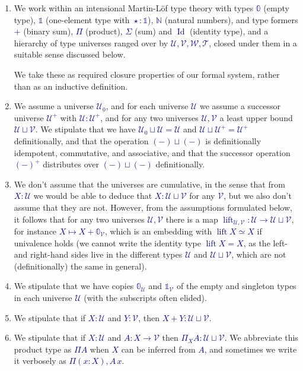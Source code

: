 \documentclass[10pt]{article}
\newcommand{\db}{\textcolor{darkblue}}
\newcommand{\m}[1]{\db{$#1$}}
\newcommand{\lift}{\operatorname{lift}}
\newcommand{\N}{\mathbb{N}}
\newcommand{\U}{\mathcal{U}}
\newcommand{\V}{\mathcal{V}}
\newcommand{\W}{\mathcal{W}}
\newcommand{\T}{\mathcal{T}}
\newcommand{\Zero}{\mathbb{0}}
\newcommand{\One}{\mathbb{1}}
\newcommand{\one}{\operatorname{\star}}
\newcommand{\Id}{\operatorname{Id}}
\theoremstyle{definition}
\begin{document}
\begin{enumerate}
\item We work within an intensional Martin-L\"of type theory with
  types \m{\Zero} (empty type), \m{\One} (one-element type with
  \m{\one:\One}), \m{\N} (natural numbers), and type formers \m{+}
  (binary sum), \m{\Pi} (product), \m{\Sigma} (sum) and \m{\Id}
  (identity type), and a hierarchy of type universes ranged over by
  \m{\U,\V,\W,\T}, closed under them in a suitable sense discussed
  below.

  We take these as required closure properties of our formal system,
  rather than as an inductive definition.

\item We assume a universe \m{\U_0}, and for each universe \m{\U} we
  assume a successor universe \m{\U^+} with \m{\U : \U^+}, and for any
  two universes \m{\U,\V} a least upper bound \m{\U \sqcup \V}. We
  stipulate that we have \m{\U_0 \sqcup \U = \U} and \m{\U \sqcup \U^+
    = \U^+} definitionally, and that the operation \m{(-)\sqcup(-)} is
  definitionally idempotent, commutative, and associative, and that
  the successor operation \m{(-)^+} distributes over \m{(-)\sqcup(-)}
  definitionally.

\item We don't assume that the universes are cumulative, in the sense
  that from \m{X : \U} we would be able to deduce that
  \m{X : \U \sqcup \V} for any \m{\V}, but we also don't assume that they
  are not. However, from the assumptions formulated below, it follows
  that for any two universes \m{\U,\V} there is a map
  \m{\lift_{\U,\V} : \U \to \U \sqcup \V}, for instance
  \m{X \mapsto X + \Zero_\V}, which is an embedding with
  \m{\lift X \simeq X} if univalence holds (we cannot write the identity
  type \m{\lift X = X}, as the left- and right-hand sides live in the different
  types \m{\U} and \m{\U \sqcup \V}, which are not (definitionally) the
  same in general).

\item We stipulate that we have copies \m{\Zero_\U} and \m{\One_\V} of the
  empty and singleton types in each universe \m{\U} (with the subscripts
  often elided).
\item We stipulate that if \m{X : \U} and \m{Y : \V}, then \m{X+Y : \U \sqcup \V}.
\item We stipulate that if \m{X : \U} and \m{A : X \to \V} then
  \m{\Pi_X A : \U \sqcup \V}. We abbreviate this product type as \m{\Pi A}
  when \m{X} can be inferred from \m{A}, and sometimes we write it
  verbosely as \m{\Pi (x:X), A \, x}.


\end{enumerate}
\end{document}

